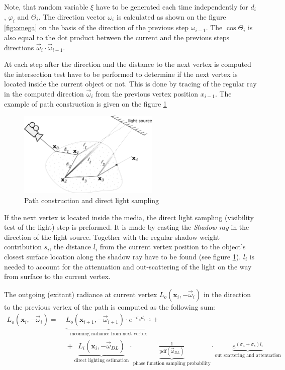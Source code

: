 Note, that random variable $\xi$ have to be generated each time independently for $d_i$, $\varphi_i$
and $\Theta_i$. The direction vector $\omega_i$ is calculated as shown on the figure \ref{fig:omega}
on the basis of the direction of the previous step $\omega_{i-1}$. The $\cos{\Theta_i}$ is also
equal to the dot product between the current and the previous steps directions
$\vec{\omega}_i\cdot\vec{\omega}_{i-1}$.

At each step after the direction and the distance to the next vertex is computed the intersection
test have to be performed to determine if the next vertex is located inside the current object or
not.
This is done by tracing of the regular ray in the computed direction $\vec{\omega}_i$ from the
previous vertex position $x_{i-1}$. The example of path construction is given on the figure
\ref{fig:path_ptdl}
\begin{figure}[h]
    \centering
    \includegraphics[width=0.6\textwidth]{imgs/schemes/path_ptdl}
    \caption{Path construction and direct light sampling}
    \label{fig:path_ptdl}
\end{figure}

If the next vertex is located inside the media, the direct light sampling (visibility
test of the light) step is preformed.
It is made by casting the \emph{Shadow ray} in the direction of the light source. Together with
the regular shadow weight contribution $s_i$, the distance $l_i$ from the current vertex position to
the object's closest surface location along the shadow ray have to be found (see figure
\ref{fig:path_ptdl}). $l_i$ is needed to account for the attenuation and out-scattering of the
light on the way from surface to the current vertex.

The outgoing (exitant) radiance at current vertex $L_o(\mathbf{x}_i, -\vec{\omega}_i)$ in the
direction to the previous vertex of the path is computed as the following sum:
\begin{align*}
L_o(\mathbf{x}_i, -\vec{\omega}_i) = &\phantom{\mid{}}
\underbrace{L_{o}(\mathbf{x}_{i+1}, -\vec{\omega}_{i+1})\cdot e^{-\sigma_a d_{i+1}}}_\text{incoming
 radiance from next vertex}+\\
& \phantom{\mid{}} +\underbrace{L_i(\mathbf{x}_i,-\vec{\omega}_{DL})}_\text{direct lighting
 estimation} \cdot \underbrace{\frac{1}{\text{pdf}(\vec{\omega}_{DL})}}_\text{phase function
 sampling probability} \cdot
\underbrace{e^{(\sigma_a+\sigma_s) l_i}}_\text{out scattering and attenuation}
\end{align*}

